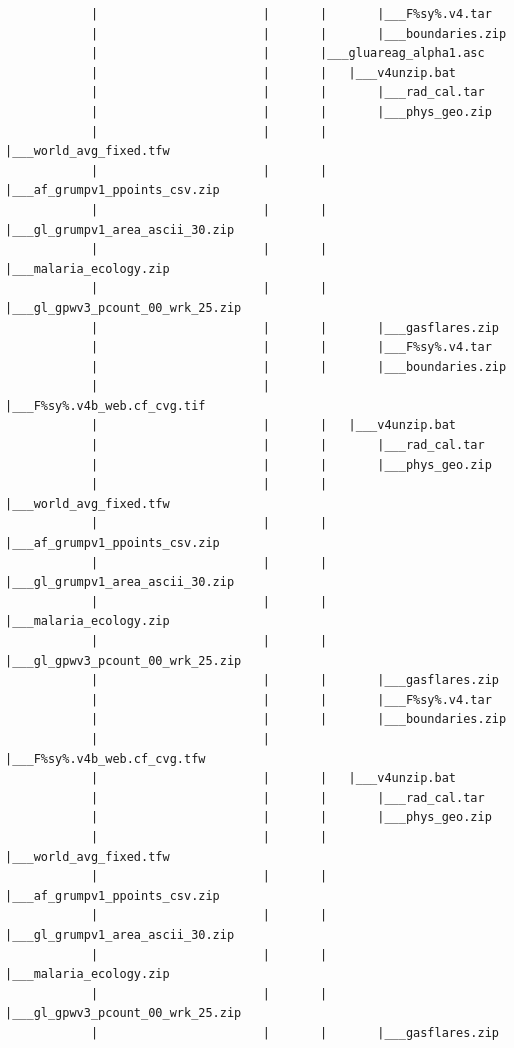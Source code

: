 \documentclass[]{book}
\begin{document}
\begin{verbatim}
            |                       |       |       |___F%sy%.v4.tar
            |                       |       |       |___boundaries.zip
            |                       |       |___gluareag_alpha1.asc
            |                       |       |   |___v4unzip.bat
            |                       |       |       |___rad_cal.tar
            |                       |       |       |___phys_geo.zip
            |                       |       |       |___world_avg_fixed.tfw
            |                       |       |       |___af_grumpv1_ppoints_csv.zip
            |                       |       |       |___gl_grumpv1_area_ascii_30.zip
            |                       |       |       |___malaria_ecology.zip
            |                       |       |       |___gl_gpwv3_pcount_00_wrk_25.zip
            |                       |       |       |___gasflares.zip
            |                       |       |       |___F%sy%.v4.tar
            |                       |       |       |___boundaries.zip
            |                       |       |___F%sy%.v4b_web.cf_cvg.tif
            |                       |       |   |___v4unzip.bat
            |                       |       |       |___rad_cal.tar
            |                       |       |       |___phys_geo.zip
            |                       |       |       |___world_avg_fixed.tfw
            |                       |       |       |___af_grumpv1_ppoints_csv.zip
            |                       |       |       |___gl_grumpv1_area_ascii_30.zip
            |                       |       |       |___malaria_ecology.zip
            |                       |       |       |___gl_gpwv3_pcount_00_wrk_25.zip
            |                       |       |       |___gasflares.zip
            |                       |       |       |___F%sy%.v4.tar
            |                       |       |       |___boundaries.zip
            |                       |       |___F%sy%.v4b_web.cf_cvg.tfw
            |                       |       |   |___v4unzip.bat
            |                       |       |       |___rad_cal.tar
            |                       |       |       |___phys_geo.zip
            |                       |       |       |___world_avg_fixed.tfw
            |                       |       |       |___af_grumpv1_ppoints_csv.zip
            |                       |       |       |___gl_grumpv1_area_ascii_30.zip
            |                       |       |       |___malaria_ecology.zip
            |                       |       |       |___gl_gpwv3_pcount_00_wrk_25.zip
            |                       |       |       |___gasflares.zip

\end{verbatim}
\end{document}
